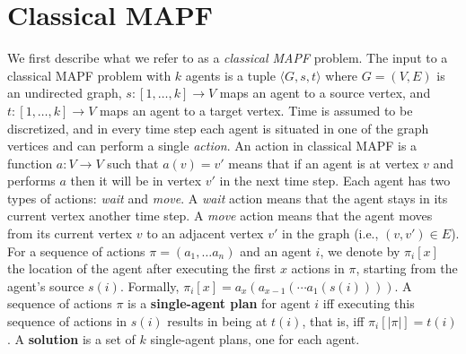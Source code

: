 \documentclass[letterpaper]{article} %
\begin{document}
\section{Classical MAPF}
We first describe what we refer to as a \emph{classical MAPF} problem.
The input to a classical MAPF problem with $k$ agents is
a tuple $\langle G, s, t\rangle$
where $G=(V,E)$ is an undirected graph,
$s:[1,\ldots,k]\rightarrow V$ maps an agent to a source vertex,
and $t:[1,\ldots,k]\rightarrow V$ maps an agent to a target vertex.
Time is assumed to be discretized, and in every time step each agent is situated in one of the graph vertices
and can perform a single \emph{action}.
An action in classical MAPF is a function $a: V\rightarrow V$
such that $a(v)=v'$ means that if an agent is at vertex $v$ and performs $a$ then it will be in vertex $v'$ in the next time step.
Each agent has two types of actions: \emph{wait} and \emph{move}.
A \emph{wait} action means that the agent stays in its current vertex another time step.
A \emph{move} action means that the agent moves from its current vertex $v$ to an adjacent vertex $v'$ in the graph (i.e., $(v,v')\in E$).
For a sequence of actions $\pi=(a_1,\ldots a_n)$
and an agent $i$,
we denote by $\pi_i[x]$
the location of the agent after executing  the first $x$ actions in $\pi$, starting from the agent's source $s(i)$.
Formally, $\pi_i[x]=a_x(a_{x-1}(\cdots a_1(s(i))))$.
A sequence of actions $\pi$ is a \textbf{single-agent plan} for agent $i$ iff executing this sequence of actions in $s(i)$ results in being at $t(i)$,
that is, iff $\pi_i[|\pi|]=t(i)$.
A \textbf{solution} is a set of $k$ single-agent plans, one for each agent.
\end{document}
